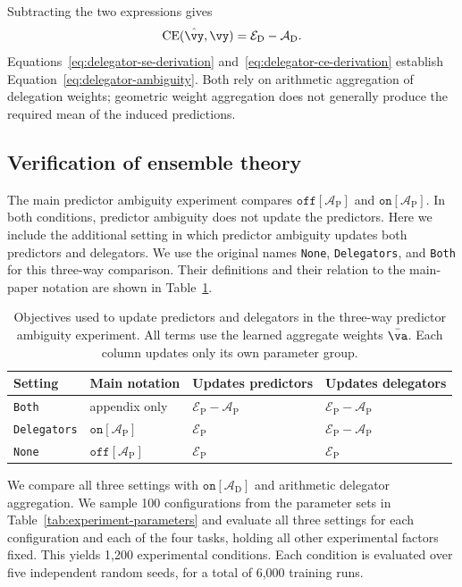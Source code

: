 \documentclass[10pt]{article} %
\newcommand{\dambiguity}{\mathcal{A}_{\mathrm{D}}}
\newcommand{\pambiguity}{\mathcal{A}_{\mathrm{P}}}
\newcommand{\pperformance}{\mathcal{E}_{\mathrm{P}}}
\newcommand{\dperformance}{\mathcal{E}_{\mathrm{D}}}
\newcommand{\ambiguityon}[1]{\ensuremath{\mathtt{on}[#1]}}
\newcommand{\ambiguityoff}[1]{\ensuremath{\mathtt{off}[#1]}}
\begin{document}
Subtracting the two expressions gives
\begin{equation}\label{eq:delegator-ce-derivation}
    \mathrm{CE}(\hat{\vy},\vy)=\dperformance-\dambiguity.
\end{equation}
Equations~\ref{eq:delegator-se-derivation} and~\ref{eq:delegator-ce-derivation} establish Equation~\ref{eq:delegator-ambiguity}. Both rely on arithmetic aggregation of delegation weights; geometric weight aggregation does not generally produce the required mean of the induced predictions.

\subsection{Verification of ensemble theory}\label{ap:verification-ensemble-theory}

The main predictor ambiguity experiment compares \ambiguityoff{\pambiguity} and \ambiguityon{\pambiguity}. In both conditions, predictor ambiguity does not update the predictors. Here we include the additional setting in which predictor ambiguity updates both predictors and delegators. We use the original names \texttt{None}, \texttt{Delegators}, and \texttt{Both} for this three-way comparison. Their definitions and their relation to the main-paper notation are shown in Table~\ref{tab:gradient-flow}.

\begin{table}[ht]
\caption{Objectives used to update predictors and delegators in the three-way predictor ambiguity experiment. All terms use the learned aggregate weights $\bar{\va}$. Each column updates only its own parameter group.}
\label{tab:gradient-flow}
\centering
\begin{tabular}{llll}
\textbf{Setting} & \textbf{Main notation} & \textbf{Updates predictors} & \textbf{Updates delegators} \\
\hline
\texttt{Both} & appendix only & $\pperformance-\pambiguity$ & $\pperformance-\pambiguity$ \\
\texttt{Delegators} & \ambiguityon{\pambiguity} & $\pperformance$ & $\pperformance-\pambiguity$ \\
\texttt{None} & \ambiguityoff{\pambiguity} & $\pperformance$ & $\pperformance$ \\
\end{tabular}
\end{table}

We compare all three settings with \ambiguityon{\dambiguity} and arithmetic delegator aggregation. We sample 100 configurations from the parameter sets in Table~\ref{tab:experiment-parameters} and evaluate all three settings for each configuration and each of the four tasks, holding all other experimental factors fixed. This yields 1,200 experimental conditions. Each condition is evaluated over five independent random seeds, for a total of 6,000 training runs.
\end{document}
